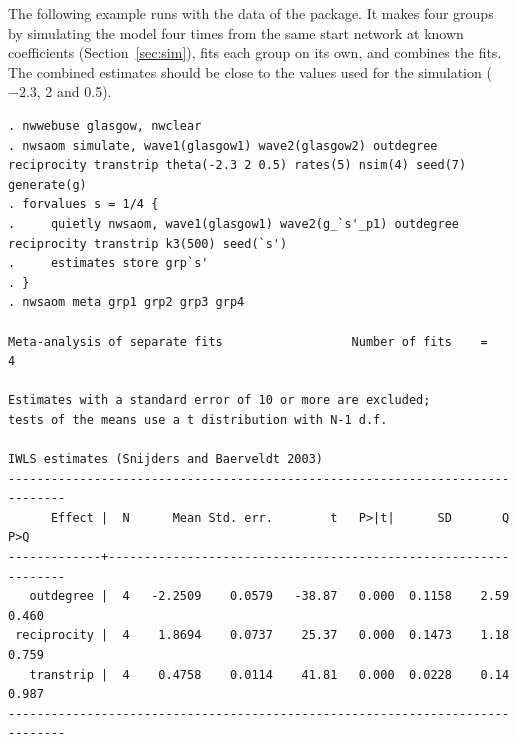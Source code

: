 The following example runs with the data of the package. It makes four groups by simulating the model four times from the same start network at known coefficients (Section~\ref{sec:sim}), fits each group on its own, and combines the fits. The combined estimates should be close to the values used for the simulation ($-2.3$, 2 and 0.5).
\begin{lstlisting}
. nwwebuse glasgow, nwclear
. nwsaom simulate, wave1(glasgow1) wave2(glasgow2) outdegree reciprocity transtrip theta(-2.3 2 0.5) rates(5) nsim(4) seed(7) generate(g)
. forvalues s = 1/4 {
.     quietly nwsaom, wave1(glasgow1) wave2(g_`s'_p1) outdegree reciprocity transtrip k3(500) seed(`s')
.     estimates store grp`s'
. }
. nwsaom meta grp1 grp2 grp3 grp4

Meta-analysis of separate fits                  Number of fits    =         4

Estimates with a standard error of 10 or more are excluded;
tests of the means use a t distribution with N-1 d.f.

IWLS estimates (Snijders and Baerveldt 2003)
------------------------------------------------------------------------------
      Effect |  N      Mean Std. err.        t   P>|t|      SD       Q     P>Q
-------------+----------------------------------------------------------------
   outdegree |  4   -2.2509    0.0579   -38.87   0.000  0.1158    2.59   0.460
 reciprocity |  4    1.8694    0.0737    25.37   0.000  0.1473    1.18   0.759
   transtrip |  4    0.4758    0.0114    41.81   0.000  0.0228    0.14   0.987
------------------------------------------------------------------------------
\end{lstlisting}
